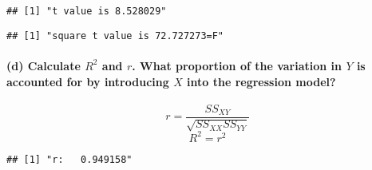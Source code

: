 \documentclass[]{article}
\newenvironment{Shaded}{\begin{snugshade}}{\end{snugshade}}
\newcommand{\KeywordTok}[1]{\textcolor[rgb]{0.13,0.29,0.53}{\textbf{#1}}}
\newcommand{\DecValTok}[1]{\textcolor[rgb]{0.00,0.00,0.81}{#1}}
\newcommand{\StringTok}[1]{\textcolor[rgb]{0.31,0.60,0.02}{#1}}
\newcommand{\OperatorTok}[1]{\textcolor[rgb]{0.81,0.36,0.00}{\textbf{#1}}}
\newcommand{\NormalTok}[1]{#1}
\let\oldparagraph\paragraph
\renewcommand{\paragraph}[1]{\oldparagraph{#1}\mbox{}}
\begin{document}
\begin{verbatim}
## [1] "t value is 8.528029"
\end{verbatim}

\begin{Shaded}
\end{Shaded}

\begin{verbatim}
## [1] "square t value is 72.727273=F"
\end{verbatim}

\paragraph{\texorpdfstring{(d) Calculate \(R^2\) and \(r\). What
proportion of the variation in \(Y\) is accounted for by introducing
\(X\) into the regression
model?}{(d) Calculate R\^{}2 and r. What proportion of the variation in Y is accounted for by introducing X into the regression model?}}\label{d-calculate-r2-and-r.-what-proportion-of-the-variation-in-y-is-accounted-for-by-introducing-x-into-the-regression-model}

\[r=\frac{SS_{XY}}{\sqrt{SS_{XX}SS_{YY}}}\] \[R^2=r^2\]

\begin{Shaded}
\end{Shaded}

\begin{verbatim}
## [1] "r:   0.949158"
\end{verbatim}

\begin{Shaded}
\end{Shaded}
\end{document}

